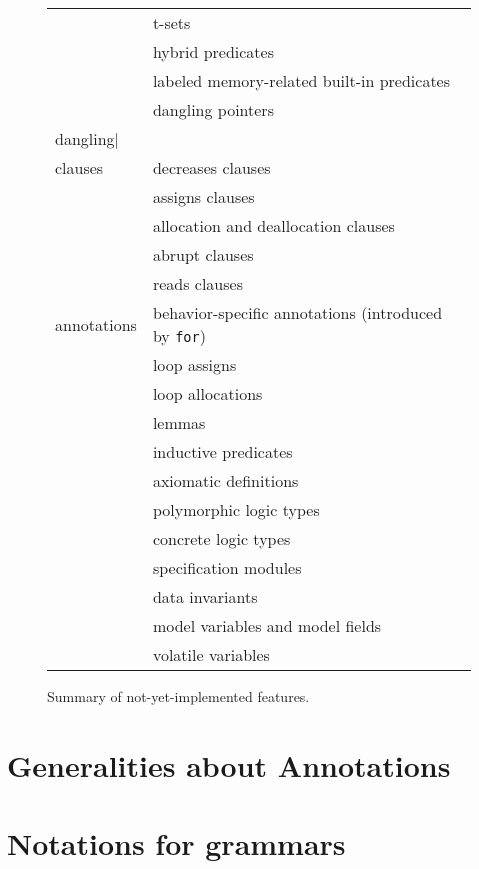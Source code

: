 {\begin{figure}[htbp]
\begin{center}
\begin{tabular}{|l|l|}
      & t-sets \\
      & hybrid predicates \\
      & labeled memory-related built-in predicates \\
      & dangling pointers \lstinline|\\dangling|
      \\
      \hline
      clauses
      & decreases clauses \\
      & assigns clauses \\
      & allocation and deallocation clauses \\
      & abrupt clauses \\
      & reads clauses
      \\
      \hline
      annotations
      & behavior-specific annotations (introduced by \lstinline|for|) \\
      & loop assigns \\
      & loop allocations \\
      & lemmas \\
      & inductive predicates \\
      & axiomatic definitions \\
      & polymorphic logic types \\
      & concrete logic types \\
      & specification modules \\
      & data invariants \\
      & model variables and model fields \\
      & volatile variables
      \\
      \hline
    \end{tabular}
  \end{center}
  \caption{Summary of not-yet-implemented features.}
  \label{fig:notyet}
\end{figure}
}%
{}

\section{Generalities about Annotations}\label{sec:gener-about-annot}
\nodiff

\section{Notations for grammars}
\nodiff
